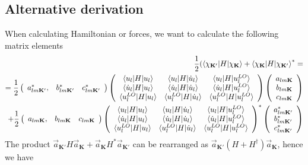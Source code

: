 \documentclass[aps,prb,floatfix,epsfig,singlecolumn,showpacs,preprintnumbers]{revtex4}
\newcommand{\vK}{{\mathbf{K}}}
\begin{document}
\subsection{Alternative derivation}

When calculating Hamiltonian or forces, we want to calculate the following matrix elements
\begin{eqnarray}
\frac{1}{2}(\braket{\chi_{\vK'}|H|\chi_\vK}+\braket{\chi_{\vK}|H|\chi_{\vK'}}^*=\\
=\frac{1}{2}
\left(
\begin{array}{ccc}
a_{lm\vK'}^*, & b_{lm\vK'}^* & c^*_{lm\vK'}
\end{array}
\right)
\left(
\begin{array}{ccc}
\braket{u_l|H|u_l} & \braket{u_l|H|\dot{u}_l} & \braket{u_l|H|u^{LO}_l} \\
\braket{\dot{u}_l|H|u_l} & \braket{\dot{u}_l|H|\dot{u}_l} & \braket{\dot{u}_l|H|u^{LO}_l} \\
\braket{u^{LO}_l|H|u_l} & \braket{u^{LO}_l|H|\dot{u}_l} & \braket{u^{LO}_l|H|u^{LO}_l} 
\end{array}
\right)
\left(
\begin{array}{c}
a_{lm\vK}\\
b_{lm\vK}\\ 
c_{lm\vK}
\end{array}
\right)
\\
+\frac{1}{2}
\left(
\begin{array}{ccc}
a_{lm\vK}, & b_{lm\vK} & c_{lm\vK}
\end{array}
\right)
\left(
\begin{array}{ccc}
\braket{u_l|H|u_l} & \braket{u_l|H|\dot{u}_l} & \braket{u_l|H|u^{LO}_l} \\
\braket{\dot{u}_l|H|u_l} & \braket{\dot{u}_l|H|\dot{u}_l} & \braket{\dot{u}_l|H|u^{LO}_l} \\
\braket{u^{LO}_l|H|u_l} & \braket{u^{LO}_l|H|\dot{u}_l} & \braket{u^{LO}_l|H|u^{LO}_l}
\end{array}
\right)^*
\left(
\begin{array}{c}
a^*_{lm{\vK'}}\\
b^*_{lm{\vK'}}\\ 
c^*_{lm{\vK'}}
\end{array}
\right)
\end{eqnarray}
The product $\vec{a}_{\vK'} H \vec{a}_\vK+\vec{a}_\vK H^* \vec{a}_{\vK'}$ can be rearranged as 
$\vec{a}_{\vK'} (H+H^\dagger) \vec{a}_\vK$, hence we have
\end{document}
